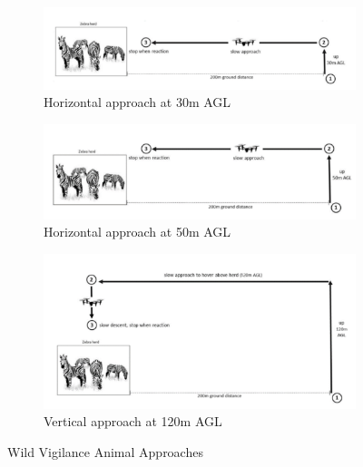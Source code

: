 \documentclass[final,5p,times,twocolumn]{elsarticle}
\begin{document}
\begin{figure}[h]
    \centering
    \begin{subfigure}[b]{0.45\textwidth}
        \centering
        \includegraphics[width=\textwidth]{figures/wv1.png}
        \caption{Horizontal approach at 30m AGL}
        \label{fig:subfig1}
    \end{subfigure}
    \hfill
    \begin{subfigure}[b]{0.45\textwidth}
        \centering
        \includegraphics[width=\textwidth]{figures/wv2.png}
        \caption{Horizontal approach at 50m AGL}
        \label{fig:subfig2}
    \end{subfigure}
    \hfill
    \begin{subfigure}[b]{0.45\textwidth}
        \centering
        \includegraphics[width=\textwidth]{figures/wv3.png}
        \caption{Vertical approach at 120m AGL}
        \label{fig:subfig3}
    \end{subfigure}
    \caption{Wild Vigilance Animal Approaches}
    \label{fig:drone_approaches}
\end{figure}
\end{document}
